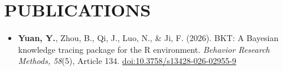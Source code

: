 \documentclass[a4paper,11pt]{article}
\begin{document}
\hfill
\section{\textbf{PUBLICATIONS}}
\begin{minipage}[t]{\linewidth}
\begin{itemize}[nosep,after=\strut, leftmargin=1em, itemsep=2pt]
    \item \textbf{Yuan, Y.}, Zhou, B., Qi, J., Luo, N., \& Ji, F. (2026). BKT: A Bayesian knowledge tracing package for the R environment. \textit{Behavior Research Methods, 58}(5), Article 134. \href{https://doi.org/10.3758/s13428-026-02955-9}{doi:10.3758/s13428-026-02955-9}
\end{itemize}
\end{minipage}
\end{document}
